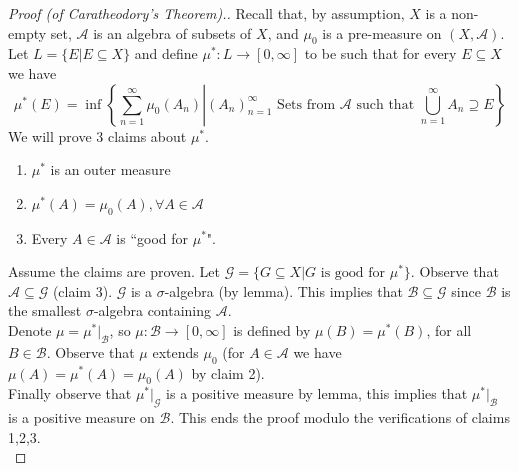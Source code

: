 \documentclass[letterpaper, 12pt]{article}
\newcommand{\cB}{\mathcal{B}}
\newcommand{\cG}{\mathcal{G}}
\newcommand{\sA}{\mathcal{A}}
\theoremstyle{stdthm}
\theoremstyle{stddef}
\theoremstyle{stdnonum}
\theoremstyle{stdqands}
\theoremstyle{stdbold}
\begin{document}
\begin{proof}[Proof (of Caratheodory's Theorem).]
Recall that, by assumption, $X$ is a non-empty set, $\sA$ is an algebra of subsets of $X$, and $\mu_0$ is a pre-measure on $(X,\sA)$. Let $L = \{E|E \subseteq X\}$ and define $\mu^*: L \to [0,\infty]$ to be such that for every $E \subseteq X$ we have 
\[\mu^*(E) = \inf \left.\left\lbrace \sum_{n=1}^\infty \mu_0 (A_n) \right| (A_n)_{n=1}^\infty \text{ Sets from } \sA \text{ such that } \bigcup_{n=1}^\infty A_n \supseteq E\right\rbrace \] 
We will prove 3 claims about $\mu^*$. 

\begin{enumerate}
\item $\mu^*$ is an outer measure
\item $\mu^*(A) = \mu_0(A), \forall A \in \sA$
\item Every $A \in \sA$ is ``good for $\mu^*$". 
\end{enumerate}
Assume the claims are proven. Let $\cG = \{G \subseteq X| G \text{ is good for } \mu^*\}$. Observe that $\sA \subseteq \cG$ (claim 3). $\cG$ is a $\sigma$-algebra (by lemma). This implies that $\cB \subseteq \cG$ since $\cB$ is the smallest $\sigma$-algebra containing $\sA$.  \\

\noindent Denote $\mu = \mu^*|_\cB$, so $\mu:\cB \rightarrow [0,\infty]$ is defined by $\mu(B) = \mu^*(B)$, for all $B \in \cB$. Observe that $\mu$ extends $\mu_0$ (for $A \in \sA$ we have $\mu(A) = \mu^*(A) = \mu_0(A)$ by claim 2). \\

\noindent Finally observe that $\mu^*|_\cG$ is a positive measure by lemma, this implies that $\mu^*|_\cB$ is a positive measure on $\cB$.  This ends the proof modulo the verifications of claims 1,2,3. \\
\end{proof}
\end{document}

